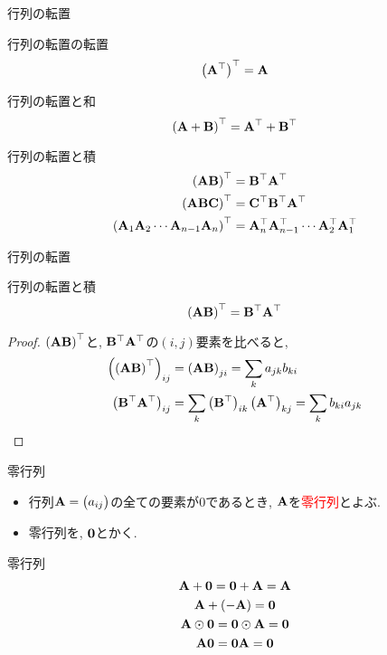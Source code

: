 \documentclass[dvipdfmx,notheorems,t]{beamer}
\begin{document}
\begin{frame}{行列の転置}
\begin{block}{行列の転置の転置}
  $$\left( \vb{A}^\top \right)^\top = \vb{A}$$
\end{block}

\begin{block}{行列の転置と和}
  $$\left( \vb{A} + \vb{B} \right)^\top = \vb{A}^\top + \vb{B}^\top$$
\end{block}

\begin{block}{行列の転置と積}
  \begin{align*}
    \left( \vb{A} \vb{B} \right)^\top &= \vb{B}^\top \vb{A}^\top \\
    \left( \vb{A} \vb{B} \vb{C} \right)^\top &= \vb{C}^\top \vb{B}^\top \vb{A}^\top \\
    \left( \vb{A}_1 \vb{A}_2 \cdots \vb{A}_{n - 1} \vb{A}_n \right)^\top
      &= \vb{A}_n^\top \vb{A}_{n - 1}^\top \cdots \vb{A}_2^\top \vb{A}_1^\top
  \end{align*}
\end{block}
\end{frame}

\begin{frame}{行列の転置}
\begin{block}{行列の転置と積}
  $$\left( \vb{A} \vb{B} \right)^\top = \vb{B}^\top \vb{A}^\top$$
\end{block}

\begin{proof}
  $\left( \vb{A} \vb{B} \right)^\top$と, $\vb{B}^\top \vb{A}^\top$の$(i, j)$要素を比べると,
  \begin{align*}
    \left( \left( \vb{A} \vb{B} \right)^\top \right)_{ij}
      &= \left( \vb{A} \vb{B} \right)_{ji}
      = \sum_k a_{jk} b_{ki} \\
    \left( \vb{B}^\top \vb{A}^\top \right)_{ij}
      &= \sum_k \left( \vb{B}^\top \right)_{ik} \left( \vb{A}^\top \right)_{kj}
      = \sum_k b_{ki} a_{jk}
  \end{align*}
\end{proof}
\end{frame}

\begin{frame}{零行列}
\begin{itemize}
  \item 行列$\vb{A} = \mqty(a_{ij})$の全ての要素が$0$であるとき, $\vb{A}$を\textcolor{red}{零行列}とよぶ.
  \item 零行列を, $\vb{0}$とかく.
\end{itemize}

\begin{block}{零行列}
  \begin{gather*}
    \vb{A} + \vb{0} = \vb{0} + \vb{A} = \vb{A} \\
    \vb{A} + \left( -\vb{A} \right) = \vb{0} \\
    \vb{A} \odot \vb{0} = \vb{0} \odot \vb{A} = \vb{0} \\
    \vb{A} \vb{0} = \vb{0} \vb{A} = \vb{0}
  \end{gather*}
\end{block}
\end{frame}
\end{document}
